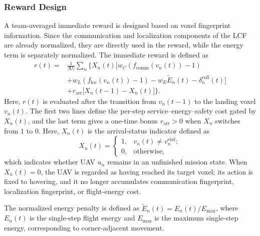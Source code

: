 \documentclass[10pt,journal,letterpaper]{IEEEtran}
\begin{document}
\subsubsection{Reward Design}
A team-averaged immediate reward is designed based on voxel fingerprint information. Since the communication and localization components of the LCF are already normalized, they are directly used in the reward, while the energy term is separately normalized. The immediate reward is defined as
\begin{equation}
\begin{aligned}
r(t)=&\frac{1}{|\mathbf{U}|}\sum_{n}\Big\{X_n(t)\Big[
 w_C(f_{\mathrm{comm}}(v_n(t))-1)\\
&+w_L(f_{\mathrm{loc}}(v_n(t))-1)-w_E\widetilde{E}_n(t)-\delta_n^{\mathrm{coll}}(t)\Big]\\
&+r_{\mathrm{arr}}\big[X_n(t-1)-X_n(t)\big]\Big\}.
\end{aligned}
\end{equation}
Here, $r(t)$ is evaluated after the transition from $v_n(t-1)$ to the landing voxel $v_n(t)$. The first two lines define the per-step service--energy--safety cost gated by $X_n(t)$, and the last term gives a one-time bonus $r_{\mathrm{arr}}>0$ when $X_n$ switches from $1$ to $0$.
Here, $X_n(t)$ is the arrival-status indicator defined as
\begin{equation}
X_n(t)=
\begin{cases}
1, & v_n(t)\neq v_n^{\mathrm{end}};\\
0, & \mathrm{otherwise},
\end{cases}
\end{equation}
which indicates whether UAV $u_n$ remains in an unfinished mission state. When $X_n(t)=0$, the UAV is regarded as having reached its target voxel; its action is fixed to hovering, and it no longer accumulates communication fingerprint, localization fingerprint, or flight-energy cost.

The normalized energy penalty is defined as 
$\tilde{E}_n(t)=E_n(t)/E_{\max}$, where $E_n(t)$ is the single-step flight energy and 
$E_{\max}$ is the maximum single-step energy, corresponding to corner-adjacent movement.
\end{document}
